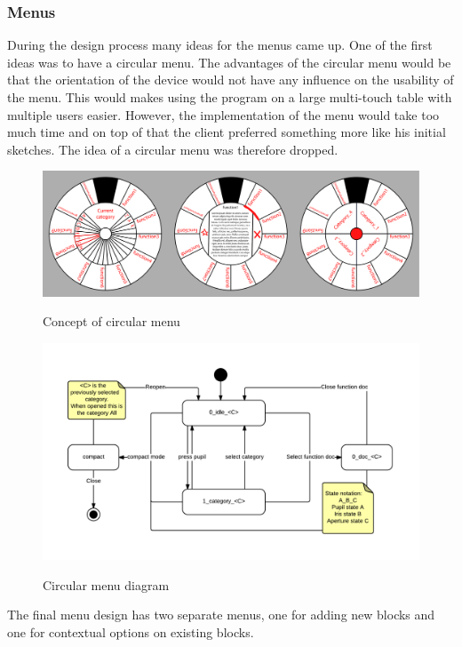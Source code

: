 \subsubsection{Menus}

During the design process many ideas for the menus came up.
One of the first ideas was to have a circular menu. \label{circular_menu} 
The advantages of the circular menu would be that the orientation of the device would not have any influence on the usability of the menu.
This would makes using the program on a large multi-touch table with multiple users easier.
However, the implementation of the menu would take too much time and on top of that the client preferred something more like his initial sketches. The idea of a circular menu was therefore dropped.

\begin{figure}[p]
	\centering
	\includegraphics[width=\textwidth]{Images/circlary}
	\label{fig:circlary}
	\caption{Concept of circular menu}
\end{figure}
\begin{figure}[p]
	\centering
	\includegraphics[scale=0.5]{Images/diagram-circlary}
	\label{fig:diagram-circlary}
	\caption{Circular menu diagram}
\end{figure}

The final menu design has two separate menus, one for adding new blocks and one for contextual options on existing blocks.

